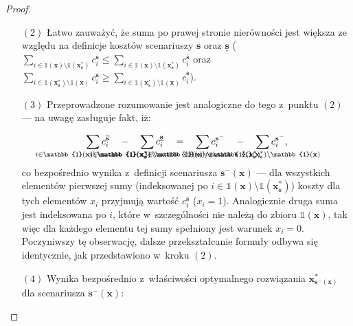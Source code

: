 \begin{proof}
\begin{itemize}
		\item[$\left( 2 \right)$] Łatwo zauważyć, że suma po prawej stronie nierówności jest większa ze względu na definicje kosztów scenariuszy $\overline{\textbf{s}}$ oraz $\underline{\textbf{s}}$ ($\sum_{i \in \mathbb{1} \left( \textbf{x} \right) \setminus \mathbb{1} \left( \textbf{x}^{\ast}_{\textbf{s}} \right)} c_{i}^{\textbf{s}} \leqslant \sum_{i \in \mathbb{1} \left( \textbf{x} \right) \setminus \mathbb{1} \left( \textbf{x}^{\ast}_{\textbf{s}} \right)} c_{i}^{\overline{\textbf{s}}}$ oraz $\sum_{i \in \mathbb{1} \left( \textbf{x}^{\ast}_{\textbf{s}} \right) \setminus \mathbb{1} \left( \textbf{x} \right)} c_{i}^{\textbf{s}} \geqslant \sum_{i \in \mathbb{1} \left( \textbf{x}^{\ast}_{\textbf{s}} \right) \setminus \mathbb{1} \left( \textbf{x} \right)} c_{i}^{\underline{\textbf{s}}}$). 
		\item[$\left( 3 \right)$] Przeprowadzone rozumowanie jest analogiczne do tego z~punktu $\left( 2 \right)$ --- na uwagę zasługuje fakt, iż:
		
		\begin{equation*}
			\sum_{\mathclap{i \in \mathbb{1} \left( \textbf{x} \right) \setminus \mathbb{1} \left( \textbf{x}^{\ast}_{\textbf{s}} \right)}} c^{\overline{\textbf{s}}}_{i} \quad - \quad \sum_{\mathclap{i \in \mathbb{1} \left( \textbf{x}^{\ast}_{\textbf{s}} \right) \setminus \mathbb{1} \left( \textbf{x} \right)}} c^{\underline{\textbf{s}}}_{i} \quad = \quad \sum_{\mathclap{i \in \mathbb{1} \left( \textbf{x} \right) \setminus \mathbb{1} \left( \textbf{x}^{\ast}_{\textbf{s}} \right)}} c^{\textbf{s}^{-}}_{i} \quad - \quad \sum_{\mathclap{i \in \mathbb{1} \left( \textbf{x}^{\ast}_{\textbf{s}} \right) \setminus \mathbb{1} \left( \textbf{x} \right)}} c^{\textbf{s}^{-}}_{i}\text{,}
		\end{equation*}
		co bezpośrednio wynika z~definicji scenariusza $\textbf{s}^{-} \left( \textbf{x} \right)$ --- dla wszystkich elementów pierwszej sumy (indeksowanej po $i \in \mathbb{1} \left( \textbf{x} \right) \setminus \mathbb{1} \left( \textbf{x}^{\ast}_{\textbf{s}} \right)$) koszty dla tych elementów $x_{i}$ przyjmują wartość $c^{\overline{\textbf{s}}}_{i}$ ($x_{i} = 1$).
		Analogicznie druga suma jest indeksowana po $i$, które w~szczególności nie należą do zbioru $\mathbb{1} \left( \textbf{x} \right)$, tak więc dla każdego elementu tej sumy spełniony jest warunek $x_{i} = 0$.
		Poczyniwszy tę obserwację, dalsze przekształcanie formuły odbywa się identycznie, jak przedstawiono w~kroku $\left( 2 \right)$.
		\item[$\left( 4 \right)$] Wynika bezpośrednio z~właściwości optymalnego rozwiązania $\textbf{x}^{\ast}_{\textbf{s}^{-} \left( \textbf{x} \right)}$ dla scenariusza $\textbf{s}^{-} \left( \textbf{x} \right)$:
		

\end{itemize}
\end{proof}
